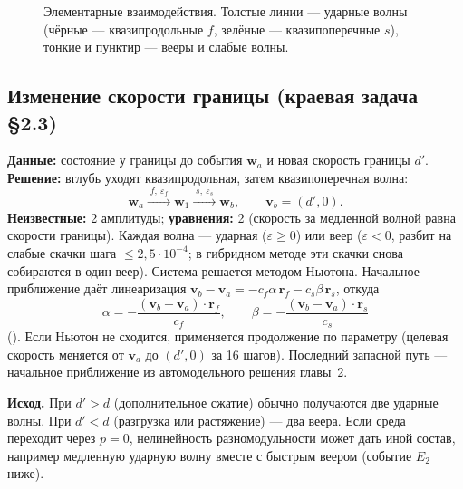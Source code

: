 \documentclass[11pt,a4paper]{article}
\theoremstyle{definition}
\theoremstyle{remark}
\newcommand{\bw}{\mathbf w}
\newcommand{\bv}{\mathbf v}
\newcommand{\br}{\mathbf r}
\newcommand{\lean}[1]{\texttt{\detokenize{#1}}}
\begin{document}
\begin{figure}[h]
\vspace{2mm}
\caption{Элементарные взаимодействия. Толстые линии --- ударные волны (чёрные --- квазипродольные $f$,
зелёные --- квазипоперечные $s$), тонкие и пунктир --- вееры и слабые волны.}\label{fig:schemes}
\end{figure}

\subsection{Изменение скорости границы (краевая задача §2.3)}
\textbf{Данные:} состояние у границы до события $\bw_a$ и новая скорость границы $d'$.
\textbf{Решение:} вглубь уходят квазипродольная, затем квазипоперечная волна:
\[
\bw_a \xrightarrow{\;f,\ \varepsilon_f\;} \bw_1 \xrightarrow{\;s,\ \varepsilon_s\;} \bw_b,\qquad \bv_b = (d',0).
\]
\textbf{Неизвестные:} 2 амплитуды; \textbf{уравнения:} 2 (скорость за медленной волной равна
скорости границы). Каждая волна --- ударная ($\varepsilon\ge0$) или веер ($\varepsilon<0$, разбит на
слабые скачки шага $\le2{,}5\cdot10^{-4}$; в гибридном методе эти скачки снова собираются в один веер).
Система решается методом Ньютона. Начальное приближение даёт линеаризация
$\bv_b-\bv_a = -c_f\alpha\,\br_f - c_s\beta\,\br_s$, откуда
\begin{equation}\label{eq:linbp}
\alpha = -\frac{(\bv_b-\bv_a)\cdot\br_f}{c_f},\qquad \beta = -\frac{(\bv_b-\bv_a)\cdot\br_s}{c_s}
\end{equation}
(\lean{lin_boundary_solution}). Если Ньютон не сходится, применяется продолжение по параметру
(целевая скорость меняется от $\bv_a$ до $(d',0)$ за 16 шагов). Последний запасной путь ---
начальное приближение из автомодельного решения главы~2.

\textbf{Исход.} При $d'>d$ (дополнительное сжатие) обычно получаются две ударные волны. При $d'<d$
(разгрузка или растяжение) --- два веера. Если среда переходит через $p=0$, нелинейность
разномодульности может дать иной состав, например медленную ударную волну вместе с быстрым веером
(событие $E_2$ ниже).
\end{document}

